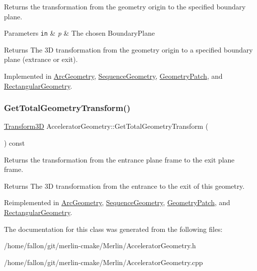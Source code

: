 Returns the transformation from the geometry origin to the specified boundary plane. 
\begin{DoxyParams}[1]{Parameters}
\mbox{\tt in}  & {\em p} & The chosen Boundary\+Plane \\
\hline
\end{DoxyParams}
\begin{DoxyReturn}{Returns}
The 3D transformation from the geometry origin to a specified boundary plane (extrance or exit). 
\end{DoxyReturn}


Implemented in \hyperlink{classArcGeometry_aaa665b9dba9b879f38cb5e4a97967533}{Arc\+Geometry}, \hyperlink{classSequenceGeometry_a4dc3260e63d8fff7b22d7d7908741b1f}{Sequence\+Geometry}, \hyperlink{classGeometryPatch_a461f15c9a93cc4473463191c9d0f6465}{Geometry\+Patch}, and \hyperlink{classRectangularGeometry_a21891a331a7ac6cb4283d95115c29020}{Rectangular\+Geometry}.

\mbox{\label{classAcceleratorGeometry_a9bffb8262fc3b28195e1e25fbfb2b8ba}} 
\subsubsection{\texorpdfstring{Get\+Total\+Geometry\+Transform()}{GetTotalGeometryTransform()}}
{\footnotesize\ttfamily \hyperlink{classTransform3D}{Transform3D} Accelerator\+Geometry\+::\+Get\+Total\+Geometry\+Transform (\begin{DoxyParamCaption}{ }\end{DoxyParamCaption}) const\hspace{0.3cm}{\ttfamily [virtual]}}

Returns the transformation from the entrance plane frame to the exit plane frame. \begin{DoxyReturn}{Returns}
The 3D transformation from the entrance to the exit of this geometry. 
\end{DoxyReturn}


Reimplemented in \hyperlink{classArcGeometry_aceed7dd7294528003f4bd9f624ef6c9b}{Arc\+Geometry}, \hyperlink{classSequenceGeometry_a8c7221a5186be9cefe0f7fc674447e71}{Sequence\+Geometry}, \hyperlink{classGeometryPatch_a94c4c26b1a43acc6a34b29d00a229d70}{Geometry\+Patch}, and \hyperlink{classRectangularGeometry_a830506a331c8b08def936613ed727c62}{Rectangular\+Geometry}.



The documentation for this class was generated from the following files\+:\begin{DoxyCompactItemize}
\item 
/home/fallon/git/merlin-\/cmake/\+Merlin/Accelerator\+Geometry.\+h\item 
/home/fallon/git/merlin-\/cmake/\+Merlin/Accelerator\+Geometry.\+cpp\end{DoxyCompactItemize}
